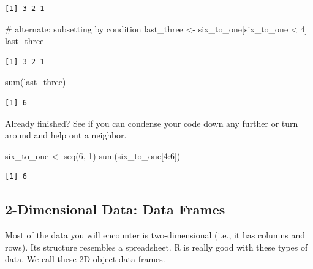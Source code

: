 \documentclass[
  letterpaper,
  DIV=11,
  numbers=noendperiod]{scrartcl}
\newenvironment{Shaded}{\begin{snugshade}}{\end{snugshade}}
\newcommand{\CommentTok}[1]{\textcolor[rgb]{0.37,0.37,0.37}{#1}}
\newcommand{\DecValTok}[1]{\textcolor[rgb]{0.68,0.00,0.00}{#1}}
\newcommand{\FunctionTok}[1]{\textcolor[rgb]{0.28,0.35,0.67}{#1}}
\newcommand{\NormalTok}[1]{\textcolor[rgb]{0.00,0.23,0.31}{#1}}
\newcommand{\OtherTok}[1]{\textcolor[rgb]{0.00,0.23,0.31}{#1}}
\newcommand{\SpecialCharTok}[1]{\textcolor[rgb]{0.37,0.37,0.37}{#1}}
\begin{document}
\begin{verbatim}
[1] 3 2 1
\end{verbatim}

\begin{Shaded}
\begin{Highlighting}[]
\CommentTok{\# alternate: subsetting by condition}
\NormalTok{last\_three }\OtherTok{\textless{}{-}}\NormalTok{ six\_to\_one[six\_to\_one }\SpecialCharTok{\textless{}} \DecValTok{4}\NormalTok{]}
\NormalTok{last\_three}
\end{Highlighting}
\end{Shaded}

\begin{verbatim}
[1] 3 2 1
\end{verbatim}

\begin{Shaded}
\begin{Highlighting}[]
\FunctionTok{sum}\NormalTok{(last\_three)}
\end{Highlighting}
\end{Shaded}

\begin{verbatim}
[1] 6
\end{verbatim}

Already finished? See if you can condense your code down any further or
turn around and help out a neighbor.

\begin{Shaded}
\begin{Highlighting}[]
\NormalTok{six\_to\_one }\OtherTok{\textless{}{-}} \FunctionTok{seq}\NormalTok{(}\DecValTok{6}\NormalTok{, }\DecValTok{1}\NormalTok{)}
\FunctionTok{sum}\NormalTok{(six\_to\_one[}\DecValTok{4}\SpecialCharTok{:}\DecValTok{6}\NormalTok{])}
\end{Highlighting}
\end{Shaded}

\begin{verbatim}
[1] 6
\end{verbatim}

\subsection{2-Dimensional Data: Data
Frames}\label{dimensional-data-data-frames}

Most of the data you will encounter is two-dimensional (i.e., it has
columns and rows). Its structure resembles a spreadsheet. R is really
good with these types of data. We call these 2D object \ul{data frames}.
\end{document}
